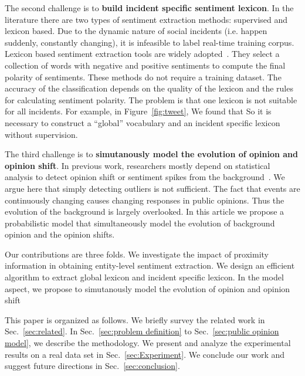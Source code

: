 \documentclass[runningheads]{llncs}
\begin{document}
The second challenge is to \textbf{build incident specific sentiment lexicon}. 
In the literature there are two types of sentiment extraction methods: supervised and lexicon based.
Due to the dynamic nature of social incidents (i.e. happen suddenly, constantly changing), it is infeasible to label real-time training corpus. 
Lexicon based sentiment extraction tools are widely adopted~\cite{sentistrength2010,Thelwall2012lexicon,Ortega2013lexicon}. They select a collection of words with negative and positive sentiments to compute the final polarity of sentiments. These methods do not
require a training dataset. The accuracy of the classification depends on the quality of the lexicon and the rules for calculating sentiment polarity. The problem is that one lexicon is not suitable for all incidents. 
For example, in Figure~\ref{fig:tweet}, We found that 
 So it is necessary to construct a ``global'' vocabulary and an incident specific lexicon without supervision.

The third challenge is to \textbf{simutanously model the evolution of opinion and opinion shift}.
In previous work, researchers mostly depend on statistical analysis to detect opinion shift or sentiment spikes from the background~\cite{Giachanou2016sentichange,Giachanou2017sentichange,Giachanou2016sentitime}.
We argue here that simply detecting outliers is not sufficient.
The fact that events are continuously changing causes changing responses in public opinions.
Thus the evolution of the background is largely overlooked.
In this article we propose a probabilistic model that simultaneously model the evolution of background opinion and the opinion shifts.

Our contributions are three folds. 
We investigate the impact of proximity information in obtaining entity-level sentiment extraction.
We design an efficient algorithm to extract global lexicon and incident specific lexicon.
In the model aspect, we propose to simutanously model the evolution of opinion and opinion shift

This paper is organized as follows. We briefly survey the related work in Sec.~\ref{sec:related}. In Sec.~\ref{sec:problem definition} to Sec.~\ref{sec:public opinion model}, we describe the methodology. We present and analyze the experimental results on a real data set in Sec.~\ref{sec:Experiment}. We conclude our work and suggest future directions in Sec.~\ref{sec:conclusion}.
\end{document}
